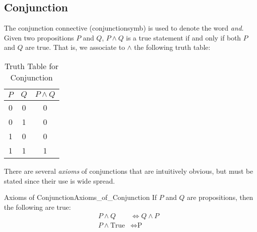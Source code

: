     \subsection{Conjunction}
        The conjunction connective (\gls{conjunctionsymb}) is used to denote the
        word \textit{and}. Given two propositions $P$ and $Q$, $P\land{Q}$ is a true
        statement if and only if both $P$ and $Q$ are true. That is, we
        associate to $\land$ the following truth table:
        \begin{table}[H]
            \centering
            \captionsetup{type=table}
            \begin{tabular}{ccc}
                $P$&$Q$&$P\land{Q}$\\
                \hline
                0&0&0\\
                0&1&0\\
                1&0&0\\
                1&1&1
            \end{tabular}
            \caption{Truth Table for Conjunction}
            \label{tab:Truth_Table_for_Conjunction}
        \end{table}
        There are several \textit{axioms} of conjunctions that are intuitively
        obvious, but must be stated since their use is wide spread.
        \begin{faxiom}{Axioms of Conjunction}{Axioms_of_Conjunction}
            If $P$ and $Q$ are propositions, then the following are true:
            \begin{align}
                P\land{Q}&\Longleftrightarrow{Q}\land{P}
                \tag{Commutativity of Conjunction}\\
                P\land\textrm{True}&\Longleftrightarrow\textrm{P}
                \tag{Identity of Conjunction}
            \end{align}
        \end{faxiom}

